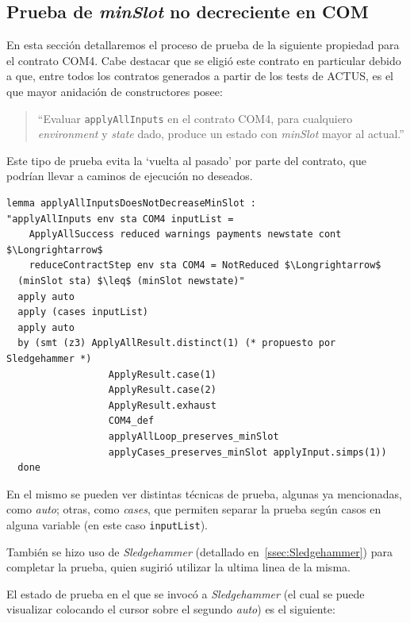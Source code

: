 \documentclass[12pt]{book}
\begin{document}
\subsection{Prueba de \textit{minSlot} no decreciente en COM}

En esta sección detallaremos el proceso de prueba de la siguiente propiedad para el contrato COM4. Cabe destacar que se eligió este contrato en particular debido a que, entre todos los contratos generados a partir de los tests de ACTUS, es el que mayor anidación de constructores posee:

\begin{quote} 
``Evaluar \texttt{applyAllInputs} en el contrato COM4, para cualquiero \textit{environment} y \textit{state} dado, produce un estado con \textit{minSlot} mayor al actual.''
\end{quote}

Este tipo de prueba evita la `vuelta al pasado' por parte del contrato, que podrían llevar a caminos de ejecución no deseados.

\begin{lstlisting}[style=Isabelle]
lemma applyAllInputsDoesNotDecreaseMinSlot :
"applyAllInputs env sta COM4 inputList = 
    ApplyAllSuccess reduced warnings payments newstate cont $\Longrightarrow$
    reduceContractStep env sta COM4 = NotReduced $\Longrightarrow$
  (minSlot sta) $\leq$ (minSlot newstate)"
  apply auto
  apply (cases inputList)
  apply auto 
  by (smt (z3) ApplyAllResult.distinct(1) (* propuesto por Sledgehammer *)
                  ApplyResult.case(1)
                  ApplyResult.case(2)
                  ApplyResult.exhaust
                  COM4_def
                  applyAllLoop_preserves_minSlot
                  applyCases_preserves_minSlot applyInput.simps(1))
  done
\end{lstlisting}

En el mismo se pueden ver distintas técnicas de prueba, algunas ya mencionadas, como \textit{auto}; otras, como \textit{cases}, que permiten separar la prueba según casos en alguna variable (en este caso \texttt{inputList}).

También se hizo uso de \textit{Sledgehammer} (detallado en~\ref{ssec:Sledgehammer}) para completar la prueba, quien sugirió utilizar la ultima linea de la misma.

El estado de prueba en el que se invocó a \textit{Sledgehammer} (el cual se puede visualizar colocando el cursor sobre el segundo \textit{auto}) es el siguiente:
\end{document}
